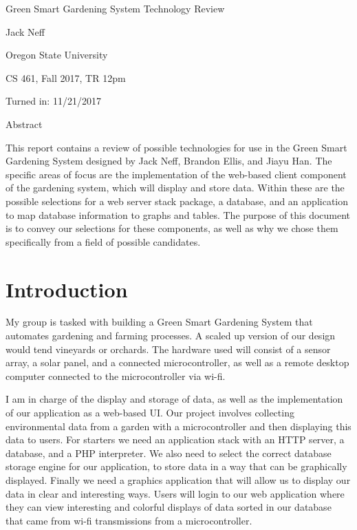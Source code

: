 \documentclass[letterpaper,10pt,titlepage]{article}
\begin{document}
\begin{center}
\thispagestyle{empty}
\parskip=14pt%
\vspace*{3\parskip}%

\Huge Green Smart Gardening System Technology Review

\large Jack Neff

\Large Oregon State University

\large CS 461, Fall 2017, TR 12pm

\large Turned in: 11/21/2017

\bigskip
\bigskip
\bigskip
\bigskip
\bigskip
\bigskip
\bigskip
\bigskip
\bigskip
\bigskip

\small Abstract

\small This report contains a review of possible technologies for use in the Green Smart Gardening System designed by Jack Neff, Brandon Ellis, and Jiayu Han. The specific areas of focus are the implementation of the web-based client component of the gardening system, which will display and store data. Within these are the possible selections for a web server stack package, a database, and an application to map database information to graphs and tables. The purpose of this document is to convey our selections for these components, as well as why we chose them specifically from a field of possible candidates.

\clearpage

\end{center}

\section{Introduction}
	
My group is tasked with building a Green Smart Gardening System that automates gardening and farming processes. A scaled up version of our design would tend vineyards or orchards. The hardware used will consist of a sensor array, a solar panel, and a connected microcontroller, as well as a remote desktop computer connected to the microcontroller via wi-fi. 

I am in charge of the display and storage of data, as well as the implementation of our application as a web-based UI. Our project involves collecting environmental data from a garden with a microcontroller and then displaying this data to users. For starters we need an application stack with an HTTP server, a database, and a PHP interpreter. We also need to select the correct database storage engine for our application, to store data in a way that can be graphically displayed. Finally we need a graphics application that will allow us to display our data in clear and interesting ways. Users will login to our web application where they can view interesting and colorful displays of data sorted in our database that came from wi-fi transmissions from a microcontroller. 
\end{document}
